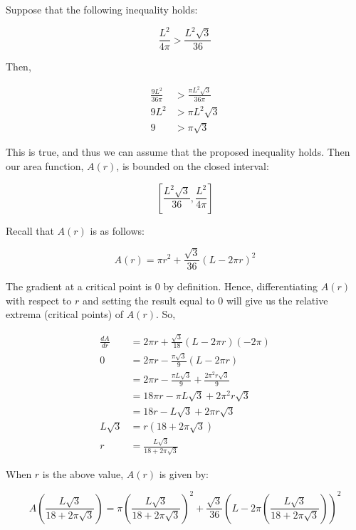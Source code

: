 \documentclass{article}
\begin{document}
    Suppose that the following inequality holds:

    \[
        \frac{L^2}{4\pi} > \frac{L^2 \sqrt{3}}{36}
    \]

    Then,

    \begin{align*}
        \frac{9L^2}{36\pi} &> \frac{\pi L^2 \sqrt{3}}{36 \pi} \\
        9L^2               &> \pi L^2 \sqrt{3} \\
        9                  &> \pi \sqrt{3}
    \end{align*}

    This is true, and thus we can assume that the proposed inequality holds. Then our area function, $A(r)$, is bounded on the closed interval:

    \[
        \left[\frac{L^2 \sqrt{3}}{36}, \frac{L^2}{4\pi}\right]
    \]

    Recall that $A(r)$ is as follows:

    \[
        A(r) = \pi r^2 + \frac{\sqrt{3}}{36}(L-2\pi r)^2
    \]

    The gradient at a critical point is 0 by definition. Hence, differentiating $A(r)$ with respect to $r$ and setting the result equal to 0 will give us the relative extrema (critical points) of $A(r)$. So,

    \begin{align*}
        \frac{dA}{dr}   &= 2\pi r + \frac{\sqrt{3}}{18}(L-2\pi r)(-2\pi) \\
        0               &= 2\pi r - \frac{\pi \sqrt{3}}{9}(L-2\pi r) \\
                        &= 2\pi r - \frac{\pi L\sqrt{3}}{9} + \frac{2\pi ^2 r\sqrt{3}}{9} \\
                        &= 18\pi r - \pi L\sqrt{3} + 2\pi ^2 r \sqrt{3} \\
                        &= 18r - L\sqrt{3} + 2\pi r\sqrt{3} \\
        L\sqrt{3}       &= r(18+2\pi\sqrt{3}) \\
        r               &= \frac{L\sqrt{3}}{18+2\pi\sqrt{3}}
    \end{align*}

    When $r$ is the above value, $A(r)$ is given by:

    \[
        A\left( \frac{L\sqrt{3}}{18+2\pi\sqrt{3}}\right) = \pi \left(\frac{L\sqrt{3}}{18+2\pi\sqrt{3}}\right)^2 + \frac{\sqrt{3}}{36}\left(L-2\pi\left(\frac{L\sqrt{3}}{18+2\pi\sqrt{3}}\right)\right)^2
    \]
\end{document}
